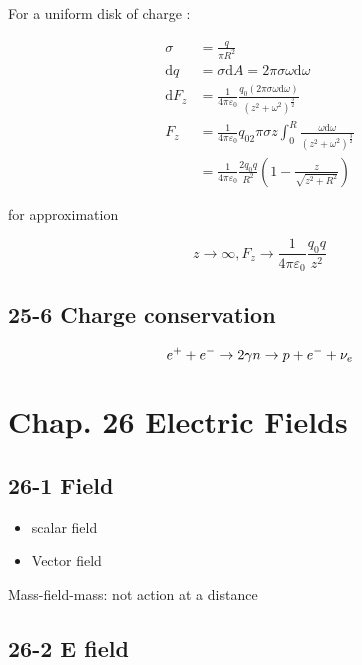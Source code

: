 \documentclass[
]{article}
\providecommand{\tightlist}{%
  \setlength{\itemsep}{0pt}\setlength{\parskip}{0pt}}
\begin{document}
For a uniform disk of charge :

\[
\begin{aligned}
\sigma &=\frac{q}{\pi R^2}\\\mathrm d q&=\sigma \mathrm dA =2\pi \sigma \omega \mathrm d\omega\\\mathrm dF_z&=\frac{1}{4\pi \varepsilon _0}\frac{q_0(2\pi \sigma \omega \mathrm d\omega)}{(z^2+\omega ^2)^{\frac{3}{2}}}\\F_z&=\frac{1}{4\pi \varepsilon _0}q_02\pi \sigma z \int _{0}^R \frac{\omega \mathrm d\omega }{(z^2+\omega ^2)^{\frac{3}{2}}}\\&=\frac{1}{4\pi \varepsilon _0 }\frac{2q_0q}{R^2}\left(1-\frac{z}{\sqrt{z^2+R^2}}\right)
\end{aligned}
\]

for approximation

\[
z\to \infty ,F_z\to \frac{1}{4\pi \varepsilon _0}\frac{q_0q}{z^2}
\]

\hypertarget{charge-conservation}{%
\subsection{25-6 Charge conservation}\label{charge-conservation}}

\[
e^++e^{-}\to 2\gamma\\n\to p+e^- +\nu_e
\]

\hypertarget{chap.-26-electric-fields}{%
\section{Chap. 26 Electric Fields}\label{chap.-26-electric-fields}}

\hypertarget{field}{%
\subsection{26-1 Field}\label{field}}

\begin{itemize}
\tightlist
\item
  scalar field
\item
  Vector field
\end{itemize}

Mass-field-mass: not action at a distance

\hypertarget{e-field}{%
\subsection{26-2 E field}\label{e-field}}
\end{document}
